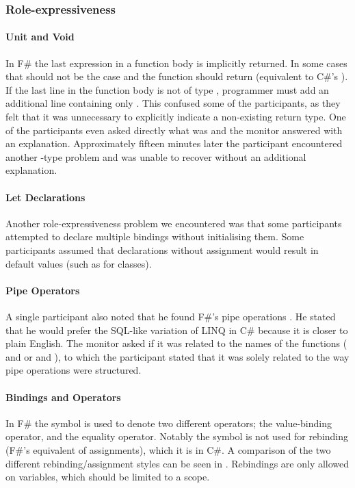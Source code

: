 \subsubsection{Role-expressiveness}
\paragraph{Unit and Void}
In F\# the last expression in a function body is implicitly returned. In some cases that should not be the case and the function should return  (equivalent to C\#'s ). If the last line in the function body is not of type , programmer must add an additional line containing only \ttt{()}. This confused some of the participants, as they felt that it was unnecessary to explicitly indicate a non-existing return type. One of the participants even asked directly what  was and the monitor answered with an explanation. Approximately fifteen minutes later the participant encountered another -type problem and was unable to recover without an additional explanation.

\paragraph{Let Declarations}
Another role-expressiveness problem we encountered was that some participants attempted to  declare multiple bindings without initialising them. Some participants assumed that  declarations without assignment would result in default values (such as  for classes).

\paragraph{Pipe Operators}
A single participant also noted that he found F\#'s pipe operations \textit{}. He stated that he would prefer the SQL-like variation of \gls{LINQ} in C\# because it is closer to plain English. The monitor asked if it was related to the names of the functions ( and  or  and ), to which the participant stated that it was solely related to the way pipe operations were structured.

\paragraph{Bindings and Operators}
In F\# the \ttt{=} symbol is used to denote two different operators; the value-binding operator, and the equality operator. Notably the symbol is not used for rebinding (F\#'s equivalent of assignments), which it is in C\#. A comparison of the two different rebinding/assignment styles can be seen in . Rebindings are only allowed on  variables, which should be limited to a scope.

